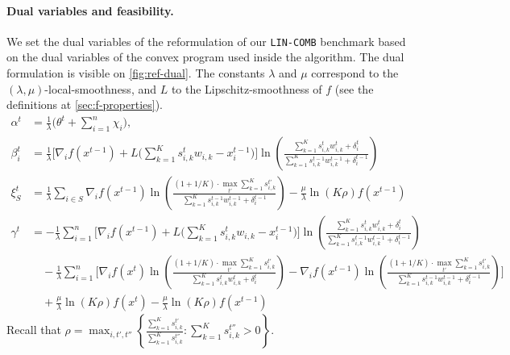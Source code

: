 \paragraph{Dual variables and feasibility.} We set the dual variables of the reformulation of our \texttt{LIN-COMB} benchmark based on the dual variables of the convex program used inside the algorithm. The dual formulation is visible on \cref{fig:ref-dual}. The constants $\lambda$ and $\mu$ correspond to the $(\lambda,\mu)$-local-smoothness, and $L$ to the Lipschitz-smoothness of $f$ (see the definitions at \cref{sec:f-properties}).
%
\begin{align*}
    \alpha^{t} &= \frac{1}{\lambda}  \biggl( \theta^{t} + \sum_{i=1}^{n} \chi_{i} \biggr), \\
    \beta_{i}^{t} &= \frac{1}{\lambda} \biggl[  \nabla_{i} f(x^{t-1}) + L\biggl( \sum_{k=1}^{K} s_{i,k}^{t} w_{i,k}  - x_{i}^{t-1} \biggr) \biggr] \ln \left( \frac{\sum_{k=1}^{K} s_{i,k}^{t} w_{i,k}^{t} + \delta_{i}^{t}}{\sum_{k=1}^{K}  s_{i,k}^{t-1}w_{i,k}^{t-1}  + \delta_{i}^{t-1}} \right) \\
    \xi_{S}^{t} &= \frac{1}{\lambda} \sum_{i \in S} \nabla_{i} f(x^{t-1}) \ln \left( \frac{(1 + 1/K) \cdot \max_{t'} \sum_{k=1}^{K} s_{i,k}^{t'}}{\sum_{k=1}^{K}  s_{i,k}^{t-1}w_{i,k}^{t-1}  + \delta_{i}^{t-1}} \right) - \frac{\mu}{\lambda} \ln(K\rho)  f(x^{t-1})\\
    \gamma^{t} &= -  \frac{1}{\lambda} \sum_{i=1}^{n} \biggl[  \nabla_{i} f(x^{t-1}) + L\biggl( \sum_{k=1}^{K} s_{i,k}^{t} w_{i,k}  - x_{i}^{t-1} \biggr) \biggr]  \ln \left( \frac{\sum_{k=1}^{K} s_{i,k}^{t} w_{i,k}^{t} + \delta_{i}^{t}}{\sum_{k=1}^{K}  s_{i,k}^{t-1}w_{i,k}^{t-1}  + \delta_{i}^{t-1}} \right) \\
        & \quad - \frac{1}{\lambda} \sum_{i=1}^{n} \biggl[ \nabla_{i} f(x^{t}) \ln \left( \frac{(1 + 1/K) \cdot \max_{t'} \sum_{k=1}^{K} s_{i,k}^{t'}}{\sum_{k=1}^{K}  s_{i,k}^{t}w_{i,k}^{t}  + \delta_{i}^{t}} \right) -  \nabla_{i} f(x^{t-1}) \ln \left( \frac{(1 + 1/K) \cdot \max_{t'} \sum_{k=1}^{K} s_{i,k}^{t'}}{\sum_{k=1}^{K}  s_{i,k}^{t-1}w_{i,k}^{t-1}  + \delta_{i}^{t-1}} \right) \biggr] \\
    & \quad + \frac{\mu}{\lambda} \ln(K\rho) f(x^{t}) - \frac{\mu}{\lambda} \ln(K\rho) f(x^{t-1})
\end{align*}
%
Recall that $\rho = \max_{i, t',t''} \left\{\frac{\sum_{k=1}^{K} s_{i,k}^{t'}}{\sum_{k=1}^{K} s_{i,k}^{t''}} : \sum_{k=1}^{K} s_{i,k}^{t''} > 0 \right\}$.

